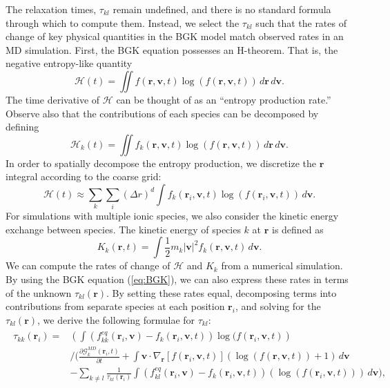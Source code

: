 \documentclass{article}
\begin{document}
The relaxation times, $\tau_{kl}$ remain undefined, and there is no standard formula through which to compute them. Instead, we select the $\tau_{kl}$ such that the rates of change of key physical quantities in the BGK model match observed rates in an MD simulation. First, the BGK equation possesses an H-theorem. That is, the negative entropy-like quantity 
\[\mathcal{H}(t) = \iint f(\mathbf{r},\mathbf{v},t)\log(f(\mathbf{r},\mathbf{v},t))\,d\mathbf{r}\,d\mathbf{v}.
\]The time derivative of $\mathcal{H}$ can be thought of as an ``entropy production rate.'' Observe also that the contributions of each species can be decomposed by defining
\begin{equation}
\mathcal{H}_k(t)=\iint f_k(\mathbf{r},\mathbf{v},t)\log(f(\mathbf{r},\mathbf{v},t))\,d\mathbf{r}\,d\mathbf{v}.
\end{equation}In order to spatially decompose the entropy production, we discretize the $\mathbf{r}$ integral according to the coarse grid:
\[\mathcal{H}(t)\approx\sum_k\sum_i (\Delta r)^d\int f_k(\mathbf{r}_i,\mathbf{v},t)\log(f(\mathbf{r}_i,\mathbf{v},t))\,d\mathbf{v}.
\] For simulations with multiple ionic species, we also consider the kinetic energy exchange between species. The kinetic energy of species $k$ at $\mathbf{r}$ is defined as
\begin{equation}K_k(\mathbf{r},t)=\int \frac{1}{2}m_k|\mathbf{v}|^2f_k(\mathbf{r},\mathbf{v},t)\,d\mathbf{v}.
\end{equation}
We can compute the rates of change of $\mathcal{H}$ and $K_k$ from a numerical simulation. By using the BGK equation (\ref{eq:BGK}), we can also express these rates in terms of the unknown $\tau_{kl}(\mathbf{r})$. By setting these rates equal, decomposing terms into contributions from separate species at each position $\mathbf{r}_i$, and solving for the $\tau_{kl}(\mathbf{r})$, we derive the following formulae for $\tau_{kl}$:
\begin{align}
\begin{split}
 \tau_{kk}(\mathbf{r}_i)=&\left(\int (f_{kk}^{eq}(\mathbf{r}_i,\mathbf{v})-f_k(\mathbf{r}_i,\mathbf{v},t))\log(f(\mathbf{r}_i,\mathbf{v},t)\right)\\&\bigg/\bigg(\frac{\partial \mathcal{G}_k^{MD}(\mathbf{r}_i,t)}{\partial t}+\int \mathbf{v}\cdot\nabla_\mathbf{r}[f(\mathbf{r}_i,\mathbf{v},t)](\log(f(\mathbf{r},\mathbf{v},t))+1)\,d\mathbf{v}\\&-\sum_{k\neq l}\frac{1}{\tau_{kl}(\mathbf{r}_i)}\int(f_{kl}^{eq}(\mathbf{r}_i,\mathbf{v})-f_k(\mathbf{r}_i,\mathbf{v},t))(\log(f(\mathbf{r}_i,\mathbf{v},t)))\,d\mathbf{v}\bigg),
\end{split}\label{eq:taukk}
\end{align}
\end{document}
